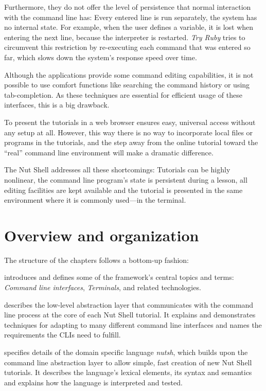 \documentclass[paper=a4,twoside,abstract=on,cleardoublepage=empty,numbers=noenddot,toc=bib,toc=listof,12pt,appendixprefix=true]{scrreprt}
\begin{document}
Furthermore, they do not offer the level of persistence that normal interaction with the command line has: Every entered line is run separately, the system has no internal state. For example, when the user defines a variable, it is lost when entering the next line, because the interpreter is restarted. \emph{Try Ruby} tries to circumvent this restriction by re-executing each command that was entered so far, which slows down the system's response speed over time.

Although the applications provide some command editing capabilities, it is not possible to use comfort functions like searching the command history or using tab-completion. As these techniques are essential for efficient usage of these interfaces, this is a big drawback.

To present the tutorials in a web browser ensures easy, universal access without any setup at all. However, this way there is no way to incorporate local files or programs in the tutorials, and the step away from the online tutorial toward the “real” command line environment will make a dramatic difference.

The Nut Shell addresses all these shortcomings: Tutorials can be highly nonlinear, the command line program's state is persistent during a lesson, all editing facilities are kept available and the tutorial is presented in the same environment where it is commonly used---in the terminal.

\section{Overview and organization}

The structure of the chapters follows a bottom-up fashion:

 introduces and defines some of the framework's central topics and terms: \emph{Command line interfaces}, \emph{Terminals}, and related technologies.

 describes the low-level abstraction layer that communicates with the command line process at the core of each Nut Shell tutorial. It explains and demonstrates techniques for adapting to many different command line interfaces and names the requirements the CLIs need to fulfill.

 specifies details of the domain specific language \emph{nutsh}, which builds upon the command line abstraction layer to allow simple, fast creation of new Nut Shell tutorials. It describes the language's lexical elements, its syntax and semantics and explains how the language is interpreted and tested.
\end{document}
